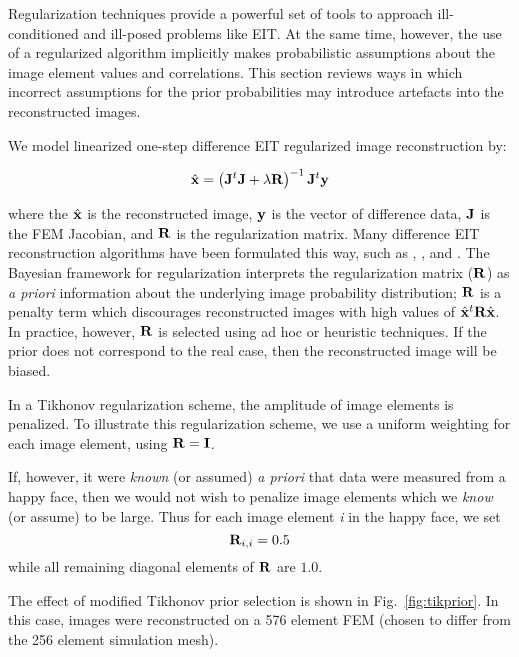 \documentclass[12pt]{iopart}
\begin{document}
Regularization techniques provide a powerful set of tools
to approach ill-conditioned and ill-posed problems like
EIT. At the same time, however, the use of a regularized
algorithm implicitly makes probabilistic assumptions
about the image element values and correlations. 
This section reviews ways in which incorrect assumptions for
the prior probabilities may introduce artefacts into 
the reconstructed images.

We model linearized one-step difference
EIT regularized image reconstruction
by:

\begin{equation}
   \hat{\bf x} = 
   \left({\bf J}^t{\bf J} + \lambda{\bf R}\right)^{-1}
         {\bf J}^t{\bf y}
\end{equation}

where the $\hat{\bf x}$ is the reconstructed image, 
$\bf y$ is the vector of difference data,
$\bf J$ is the FEM Jacobian, 
and $\bf R$ is the regularization matrix. Many 
difference EIT reconstruction algorithms have been
formulated this way, such as
\cite{Cheney_etal_1990}, \cite{Adler_and_Guardo_1996},
and \cite{Polydorides_2002}.
The Bayesian framework for regularization interprets
the regularization matrix ($\bf R$) as {\em a priori} information 
about the underlying image probability distribution;
$\bf R$ is a penalty term which discourages reconstructed
images with high values of $\hat{\bf x}^t{\bf R}\hat{\bf x}$.
In practice, however, $\bf R$ is selected using
ad hoc or heuristic techniques. If the prior does
not correspond to the real case, then the reconstructed
image will be biased.

In a Tikhonov regularization scheme, the amplitude
of image elements is penalized. To illustrate
this regularization scheme, we use a uniform
weighting for each image element, using ${\bf R} = {\bf I}$.

If, however, it were {\em known} (or assumed) {\em a priori} that 
data were measured from a happy face, then we 
would not wish to penalize image elements which we
{\em know} (or assume) to be large. Thus for each image element {\em i}
in the happy face, we set 
\begin{equation}
   {\bf R}_{i,i} = 0.5
\end{equation}
while all remaining diagonal elements of $\bf R$ are $1.0$.

The effect of modified Tikhonov prior selection is shown in
Fig.~\ref{fig:tikprior}.
In this case, images were reconstructed on a 576 element
FEM (chosen to differ from the 256 element simulation mesh).
\end{document}
